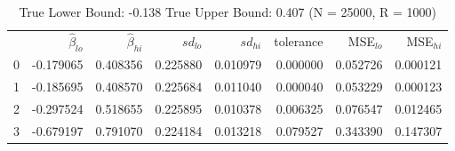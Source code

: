 \begin{table}
\caption{True Lower Bound: -0.138 True Upper Bound: 0.407 (N = 25000, R = 1000)}
\begin{tabular}{lrrrrrrr}
 & $\hat{\beta}_{lo}$ & $\hat{\beta}_{hi}$ & $sd_{lo}$ & $sd_{hi}$ & tolerance & MSE$_{lo}$ & MSE$_{hi}$ \\
0 & -0.179065 & 0.408356 & 0.225880 & 0.010979 & 0.000000 & 0.052726 & 0.000121 \\
1 & -0.185695 & 0.408570 & 0.225684 & 0.011040 & 0.000040 & 0.053229 & 0.000123 \\
2 & -0.297524 & 0.518655 & 0.225895 & 0.010378 & 0.006325 & 0.076547 & 0.012465 \\
3 & -0.679197 & 0.791070 & 0.224184 & 0.013218 & 0.079527 & 0.343390 & 0.147307 \\
\end{tabular}
\end{table}
